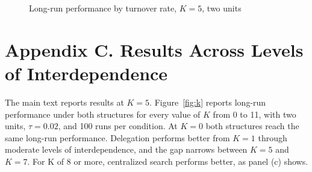 \documentclass[11pt]{article}
\begin{document}
\begin{figure}[h]
\centering
{}
\caption{Long-run performance by turnover rate, $K = 5$, two units}
\label{fig:tau}
\end{figure}

\clearpage
\section*{Appendix C. Results Across Levels of Interdependence}

The main text reports results at $K = 5$. Figure~\ref{fig:k} reports long-run performance under both structures for every value of $K$ from 0 to 11, with two units, $\tau = 0.02$, and 100 runs per condition. At $K = 0$ both structures reach the same long-run performance. Delegation performs better from $K = 1$ through moderate levels of interdependence, and the gap narrows between $K = 5$ and $K = 7$. For K of 8 or more, centralized search performs better, as panel (c) shows.
\end{document}
